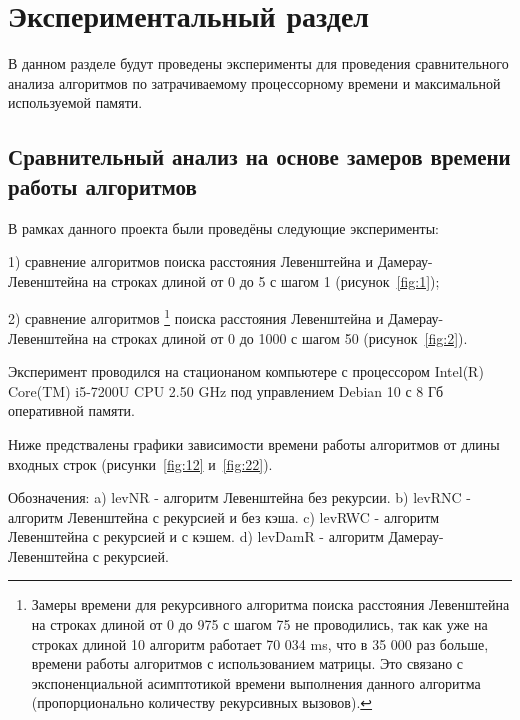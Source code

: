 \chapter{Экспериментальный раздел}
\label{cha:research}
    В данном разделе будут проведены эксперименты для проведения 
    сравнительного анализа алгоритмов по затрачиваемому процессорному 
    времени и максимальной используемой памяти.
    \section{Сравнительный анализ на основе замеров времени работы алгоритмов}
        В рамках данного проекта были проведёны следующие эксперименты:

        1) сравнение алгоритмов поиска расстояния Левенштейна и Дамерау-Левенштейна
        на строках длиной от 0 до 5 с шагом 1 (рисунок~\ref{fig:1});
        
        2) сравнение алгоритмов \footnote{Замеры времени для рекурсивного алгоритма поиска расстояния Левенштейна
        на строках длиной от 0 до 975 с шагом 75 не проводились, так как уже на
        строках длиной 10 алгоритм работает 70 034 ms, что в 35 000 раз больше, 
        времени работы алгоритмов с использованием матрицы. Это связано с экспоненциальной асимптотикой
        времени выполнения данного алгоритма (пропорционально количеству
        рекурсивных вызовов).} поиска расстояния Левенштейна и Дамерау-Левенштейна
        на строках длиной от 0 до 1000 с шагом 50 (рисунок~\ref{fig:2}).
        
        Эксперимент проводился на стационаном компьютере с процессором
        Intel(R) Core(TM) i5-7200U CPU 2.50 GHz \cite{processor-i5-7200u}
        под управлением Debian 10 с 8 Гб оперативной памяти.

        Ниже предствалены графики зависимости времени работы алгоритмов от длины входных строк
        (рисунки~\ref{fig:12} и~\ref{fig:22}).

        Обозначения:\newline
            a) levNR - алгоритм Левенштейна без рекурсии.\newline
            b) levRNC - алгоритм Левенштейна с рекурсией и без кэша.\newline
            c) levRWC - алгоритм Левенштейна с рекурсией и с кэшем.\newline
            d) levDamR - алгоритм Дамерау-Левенштейна с рекурсией.\newline

